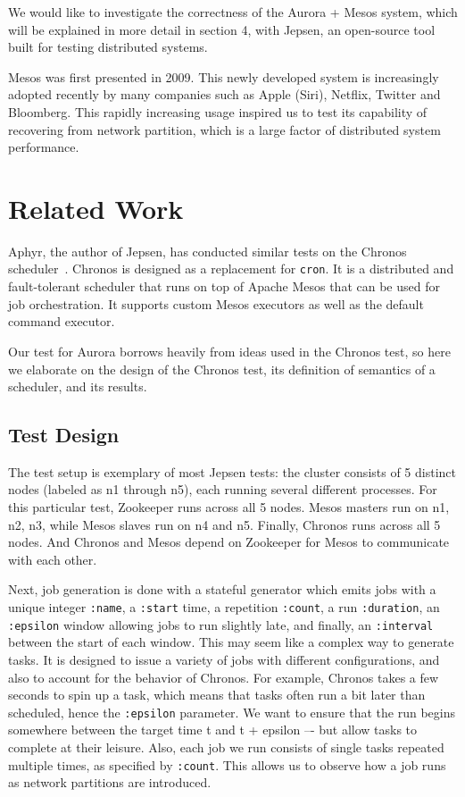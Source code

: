 \documentclass[letterpaper,twocolumn,10pt]{article}
\begin{document}
We would like to investigate the correctness of the Aurora + Mesos system, which will be explained in more detail in section 4, with Jepsen, an open-source tool built for testing distributed systems. 

Mesos was first presented in 2009. This newly developed system is increasingly adopted recently by many companies such as Apple (Siri), Netflix, Twitter and Bloomberg. This rapidly increasing usage inspired us to test its capability of recovering from network partition, which is a large factor of distributed system performance.

\section{Related Work}
Aphyr, the author of  Jepsen, has conducted similar tests on the Chronos scheduler~\cite{Chronos}. Chronos is designed as a replacement for \verb|cron|. It is a distributed and fault-tolerant scheduler that runs on top of Apache Mesos that can be used for job orchestration. It supports custom Mesos executors as well as the default command executor. 

Our test for Aurora borrows heavily from ideas used in the Chronos test, so here we elaborate on the design of the Chronos test, its definition of semantics of a scheduler, and its results.

\subsection{Test Design}
The test setup is exemplary of most Jepsen tests: the cluster consists of 5 distinct nodes (labeled as n1 through n5), each running several different processes. For this particular test, Zookeeper runs across all 5 nodes. Mesos masters run on n1, n2, n3, while Mesos slaves run on n4 and n5. Finally, Chronos runs across all 5 nodes. And Chronos and Mesos depend on Zookeeper for Mesos to communicate with each other.

Next, job generation is done with a stateful generator which emits jobs with a unique integer \verb|:name|, a \verb|:start| time, a repetition \verb|:count|, a run \verb|:duration|, an \verb|:epsilon| window allowing jobs to run slightly late, and finally, an \verb|:interval| between the start of each window. This may seem like a complex way to generate tasks. It is designed to issue a variety of jobs with different configurations, and also to account for the behavior of Chronos. For example, Chronos takes a few seconds to spin up a task, which means that tasks often run a bit later than scheduled, hence the \verb|:epsilon| parameter. We want to ensure that the run begins somewhere between the target time t and t + epsilon –- but allow tasks to complete at their leisure. Also, each job we run consists of single tasks repeated multiple times, as specified by \verb|:count|. This allows us to observe how a job runs as network partitions are introduced.
\end{document}
